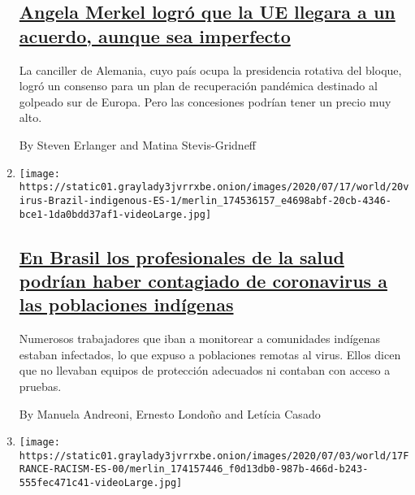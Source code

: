 \begin{enumerate}
  \hypertarget{angela-merkel-logruxf3-que-la-ue-llegara-a-un-acuerdo-aunque-sea-imperfecto}{%
  \subsection{\texorpdfstring{\href{/es/2020/07/22/espanol/mundo/coronavirus-union-europea-estimulo.html}{Angela
  Merkel logró que la UE llegara a un acuerdo, aunque sea
  imperfecto}}{Angela Merkel logró que la UE llegara a un acuerdo, aunque sea imperfecto}}\label{angela-merkel-logruxf3-que-la-ue-llegara-a-un-acuerdo-aunque-sea-imperfecto}}

  La canciller de Alemania, cuyo país ocupa la presidencia rotativa del
  bloque, logró un consenso para un plan de recuperación pandémica
  destinado al golpeado sur de Europa. Pero las concesiones podrían
  tener un precio muy alto.

  By Steven Erlanger and Matina Stevis-Gridneff
\item
  \texttt{[image: https://static01.graylady3jvrrxbe.onion/images/2020/07/17/world/20virus-Brazil-indigenous-ES-1/merlin\_174536157\_e4698abf-20cb-4346-bce1-1da0bdd37af1-videoLarge.jpg]}

  \hypertarget{en-brasil-los-profesionales-de-la-salud-podruxedan-haber-contagiado-de-coronavirus-a-las-poblaciones-induxedgenas}{%
  \subsection{\texorpdfstring{\href{/es/2020/07/20/espanol/america-latina/brasil-coronavirus-comunidades-indigenas.html}{En
  Brasil los profesionales de la salud podrían haber contagiado de
  coronavirus a las poblaciones
  indígenas}}{En Brasil los profesionales de la salud podrían haber contagiado de coronavirus a las poblaciones indígenas}}\label{en-brasil-los-profesionales-de-la-salud-podruxedan-haber-contagiado-de-coronavirus-a-las-poblaciones-induxedgenas}}

  Numerosos trabajadores que iban a monitorear a comunidades indígenas
  estaban infectados, lo que expuso a poblaciones remotas al virus.
  Ellos dicen que no llevaban equipos de protección adecuados ni
  contaban con acceso a pruebas.

  By Manuela Andreoni, Ernesto Londoño and Letícia Casado
\item
  \texttt{[image: https://static01.graylady3jvrrxbe.onion/images/2020/07/03/world/17FRANCE-RACISM-ES-00/merlin\_174157446\_f0d13db0-987b-466d-b243-555fec471c41-videoLarge.jpg]}


\end{enumerate}
